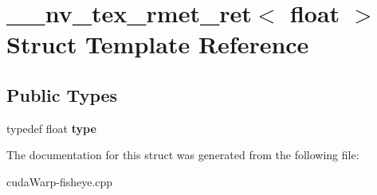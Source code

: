 \hypertarget{struct____nv__tex__rmet__ret_3_01float_01_4}{}\section{\+\_\+\+\_\+nv\+\_\+tex\+\_\+rmet\+\_\+ret$<$ float $>$ Struct Template Reference}
\label{struct____nv__tex__rmet__ret_3_01float_01_4}
\subsection*{Public Types}
\begin{DoxyCompactItemize}
\item 
typedef float {\bfseries type}\hypertarget{struct____nv__tex__rmet__ret_3_01float_01_4_aca09aa559a1ace0b95a1b193cab83c5f}{}\label{struct____nv__tex__rmet__ret_3_01float_01_4_aca09aa559a1ace0b95a1b193cab83c5f}

\end{DoxyCompactItemize}


The documentation for this struct was generated from the following file\+:\begin{DoxyCompactItemize}
\item 
cuda\+Warp-\/fisheye.\+cpp\end{DoxyCompactItemize}
